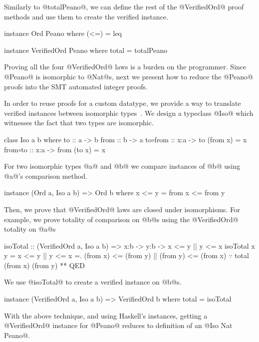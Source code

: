 Similarly to @totalPeano@, we can define the rest of the @VerifiedOrd@
proof methods and use them to create the verified instance.
%
\begin{code}
  instance Ord Peano where
    (<=) = leq

  instance VerifiedOrd Peano where
    total = totalPeano
\end{code}
%
Proving all the four @VerifiedOrd@ laws
is a burden on the programmer.
%
Since @Peano@ is isomorphic to @Nat@s,
next we present how
to reduce the @Peano@ proofs into the
SMT automated integer proofs.

%
In order to reuse proofs for a custom datatype,
we provide a way to translate verified instances between isomorphic types~\cite{barthe2001type}.
%
We design a typeclass @Iso@ which witnesses the fact that
two types are isomorphic.

\begin{mcode}
  class Iso a b where
    to      :: a -> b
    from    :: b -> a
    to$\circ$from :: x:a -> {to (from x) = x}
    from$\circ$to :: x:a -> {from (to x) = x}
\end{mcode}
%
For two isomorphic types @a@ and @b@
we compare instances of @b@ using @a@'s
comparison method.
%
\begin{mcode}
  instance (Ord a, Iso a b) => Ord b where
    x <= y = from x <= from y
\end{mcode}
%
Then, we prove that @VerifiedOrd@ laws are closed under isomorphisms.
%
For example, we prove totality of comparison on @b@s
using the @VerifiedOrd@ totality on @a@s

\begin{mcode}
  isoTotal :: (VerifiedOrd a, Iso a b)
           => x:b -> y:b -> {x <= y || y <= x}
  isoTotal x y
   =  x <= y || y <= x
   =. (from x) <= (from y) || (from y) <= (from x)
      $\because$ total (from x) (from y)
   ** QED
\end{mcode}
%
We use @isoTotal@ to create a verified instance on @b@s.
\begin{mcode}
  instance (VerifiedOrd a, Iso a b) 
         => VerifiedOrd b where
    total   = isoTotal
\end{mcode}
%
With the above technique,
and using Haskell's instances,
getting a @VerifiedOrd@ instance for @Peano@
reduces to definition of an @Iso Nat Peano@.

